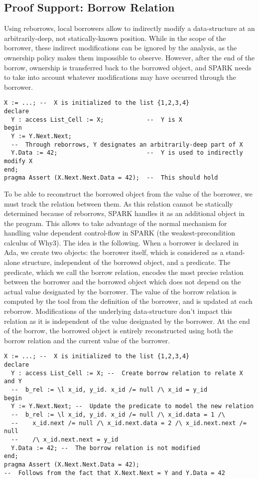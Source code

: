 \documentclass[runningheads]{llncs}
\begin{document}
\subsection{Proof Support: Borrow Relation}
Using reborrows, local borrowers allow to indirectly modify a data-structure at an arbitrarily-deep, not statically-known position. While in the scope of the borrower, these indirect modifications can be ignored by the analysis, as the ownership policy makes them impossible to observe. However, after the end of the borrow, ownership is transferred back to the borrowed object, and SPARK needs to take into account whatever modifications may have occurred through the borrower.
\begin{lstlisting}
X := ...; --  X is initialized to the list {1,2,3,4}
declare
  Y : access List_Cell := X;            --  Y is X
begin
  Y := Y.Next.Next; 
  --  Through reborrows, Y designates an arbitrarily-deep part of X
  Y.Data := 42;                         --  Y is used to indirectly modify X
end;
pragma Assert (X.Next.Next.Data = 42);  --  This should hold
\end{lstlisting}
To be able to reconstruct the borrowed object from the value of the borrower, we must track the relation between them. As this relation cannot be statically determined because of reborrows, SPARK handles it as an additional object in the program. This allows to take advantage of the normal mechanism for handling value dependent control-flow in SPARK (the weakest-precondition calculus of Why3).
The idea is the following. When a borrower is declared in Ada, we create two objects: the borrower itself, which is considered as a stand-alone structure, independent of the borrowed object, and a predicate. The predicate, which we call the borrow relation, encodes the most precise relation between the borrower and the borrowed object which does not depend on the actual value designated by the borrower. The value of the borrow relation is computed by the tool from the definition of the borrower, and is updated at each reborrow. Modifications of the underlying data-structure don’t impact this relation as it is independent of the value designated by the borrower. At the end of the borrow, the borrowed object is entirely reconstructed using both the borrow relation and the current value of the borrower.
\begin{lstlisting}
X := ...; --  X is initialized to the list {1,2,3,4}
declare
  Y : access List_Cell := X; --  Create borrow relation to relate X and Y
  --  b_rel := \l x_id, y_id. x_id /= null /\ x_id = y_id
begin
  Y := Y.Next.Next; --  Update the predicate to model the new relation
  --  b_rel := \l x_id, y_id. x_id /= null /\ x_id.data = 1 /\
  --    x_id.next /= null /\ x_id.next.data = 2 /\ x_id.next.next /= null
  --    /\ x_id.next.next = y_id
  Y.Data := 42; --  The borrow relation is not modified
end;
pragma Assert (X.Next.Next.Data = 42);
--  Follows from the fact that X.Next.Next = Y and Y.Data = 42
\end{lstlisting}
\end{document}
